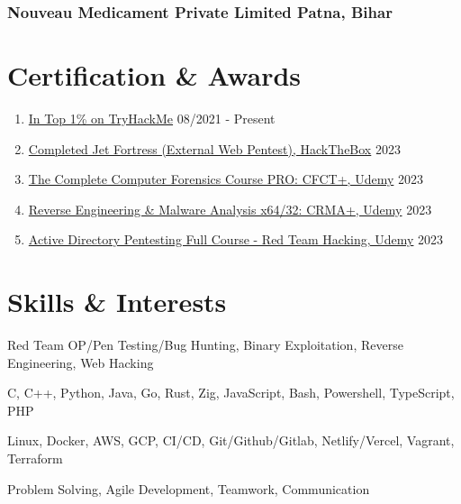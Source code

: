 \documentclass[11pt]{article} %
\begin{document}
\subsubsection{Nouveau Medicament Private Limited \hfill Patna, Bihar}

\vspace{18pt}

\section{Certification \& Awards}
\begin{enumerate}[label=\null, left=0pt..0pt, itemsep=0pt]
	\item \href{https://tryhackme.com/p/thehackersbrain}{In Top 1\% on TryHackMe} \hfill 08/2021 - Present
  \item \href{https://www.instagram.com/p/CpqIzPHPiM5/}{Completed Jet Fortress (External Web Pentest), HackTheBox} \hfill 2023
	\item \href{https://www.udemy.com/certificate/UC-11c0ac06-52c6-4b05-b48a-a91552b8eeed/}{The Complete Computer Forensics Course PRO: CFCT+, Udemy} \hfill 2023
	\item \href{https://www.udemy.com/certificate/UC-2d40b62d-ed80-4b82-9922-896ee12cb989/}{Reverse Engineering \& Malware Analysis x64/32: CRMA+, Udemy} \hfill 2023
	\item \href{https://www.udemy.com/certificate/UC-4ae950ef-117a-4a64-b845-c545d7714d77/}{Active Directory Pentesting Full Course - Red Team Hacking, Udemy} \hfill 2023
\end{enumerate}

\section{Skills \& Interests}
\begin{description}[itemsep=0pt]
  \item[Hacking] Red Team OP/Pen Testing/Bug Hunting, Binary Exploitation, Reverse Engineering, Web Hacking
	\item[Programming] C, C++, Python, Java, Go, Rust, Zig, JavaScript, Bash, Powershell, TypeScript, PHP
	\item[DevOps] Linux, Docker, AWS, GCP, CI/CD, Git/Github/Gitlab, Netlify/Vercel, Vagrant, Terraform
	\item[Soft Skills] Problem Solving, Agile Development, Teamwork, Communication
\end{description}
\end{document}
